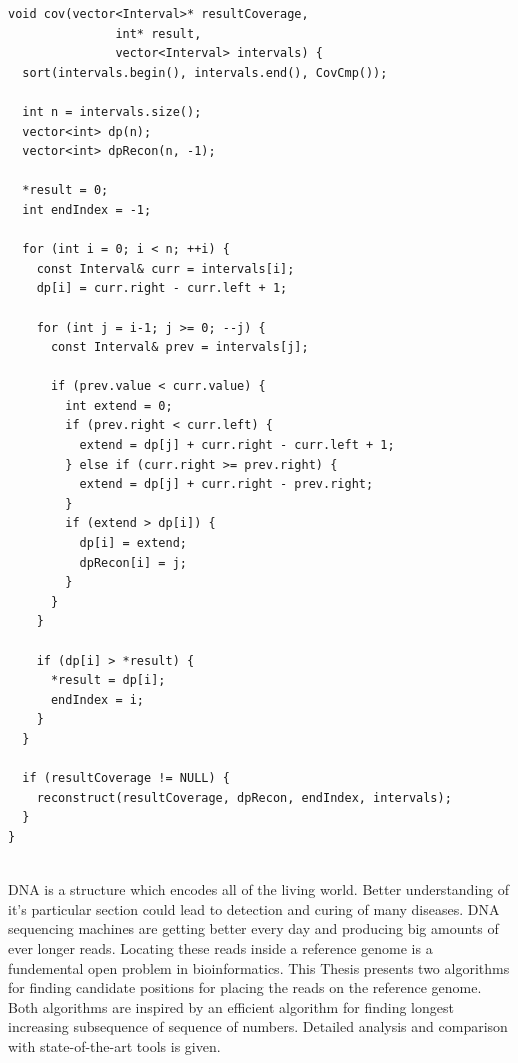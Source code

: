\documentclass[times, utf8, diplomski]{fer}
\begin{document}
\begin{algorithm}[H]
\begin{lstlisting}
void cov(vector<Interval>* resultCoverage,
               int* result,
               vector<Interval> intervals) {
  sort(intervals.begin(), intervals.end(), CovCmp());

  int n = intervals.size();
  vector<int> dp(n);
  vector<int> dpRecon(n, -1);

  *result = 0;
  int endIndex = -1;

  for (int i = 0; i < n; ++i) {
    const Interval& curr = intervals[i];
    dp[i] = curr.right - curr.left + 1;

    for (int j = i-1; j >= 0; --j) {
      const Interval& prev = intervals[j];

      if (prev.value < curr.value) {
        int extend = 0;
        if (prev.right < curr.left) {
          extend = dp[j] + curr.right - curr.left + 1;
        } else if (curr.right >= prev.right) {
          extend = dp[j] + curr.right - prev.right;
        }
        if (extend > dp[i]) {
          dp[i] = extend;
          dpRecon[i] = j;
        }
      }
    }

    if (dp[i] > *result) {
      *result = dp[i];
      endIndex = i;
    }
  }

  if (resultCoverage != NULL) {
    reconstruct(resultCoverage, dpRecon, endIndex, intervals);
  }
}


\end{lstlisting}
\end{algorithm}

\nocite{Pabinger21012013}
\nocite{Johnson:2008:BAU:1593105.1593117}
\nocite{matplotlib}




\begin{sazetak}
DNA is a structure which encodes all of the living world. Better understanding of it's particular section could lead to detection and curing of many diseases. DNA sequencing machines are getting better every day and producing
big amounts of ever longer reads. Locating these reads inside a reference genome is a fundemental open problem in bioinformatics. This Thesis presents two algorithms for finding candidate positions for placing the reads on the reference genome. Both algorithms are inspired by an efficient algorithm for finding longest increasing subsequence of sequence of numbers. Detailed analysis and comparison with state-of-the-art tools is given.

\end{sazetak}
\end{document}
